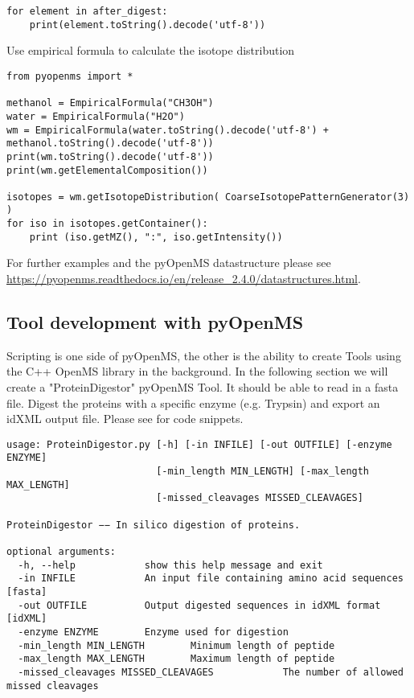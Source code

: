 {\begin{code}
\begin{verbatim}
for element in after_digest:
    print(element.toString().decode('utf-8'))
\end{verbatim}
\end{code}

\noindent Use empirical formula to calculate the isotope distribution 
\begin{code}
\begin{verbatim}
from pyopenms import *

methanol = EmpiricalFormula("CH3OH")
water = EmpiricalFormula("H2O")
wm = EmpiricalFormula(water.toString().decode('utf-8') + methanol.toString().decode('utf-8'))
print(wm.toString().decode('utf-8'))
print(wm.getElementalComposition())

isotopes = wm.getIsotopeDistribution( CoarseIsotopePatternGenerator(3) )
for iso in isotopes.getContainer():
    print (iso.getMZ(), ":", iso.getIntensity())
\end{verbatim}
\end{code}

\noindent For further examples and the pyOpenMS datastructure please see \url{https://pyopenms.readthedocs.io/en/release_2.4.0/datastructures.html}. 

\subsection{Tool development with pyOpenMS}
Scripting is one side of pyOpenMS, the other is the ability to create Tools using the C++ OpenMS library in the background.  In the following section we will create a "ProteinDigestor" pyOpenMS Tool. It should be able to read in a fasta file. Digest the proteins with a specific enzyme (e.g. Trypsin) and export an idXML output file. Please see   for code snippets.

\begin{code}
\begin{verbatim}
usage: ProteinDigestor.py [-h] [-in INFILE] [-out OUTFILE] [-enzyme ENZYME]
                          [-min_length MIN_LENGTH] [-max_length MAX_LENGTH]
                          [-missed_cleavages MISSED_CLEAVAGES]

ProteinDigestor −− In silico digestion of proteins.

optional arguments:
  -h, --help            show this help message and exit
  -in INFILE            An input file containing amino acid sequences [fasta]
  -out OUTFILE          Output digested sequences in idXML format [idXML]
  -enzyme ENZYME        Enzyme used for digestion
  -min_length MIN_LENGTH		Minimum length of peptide
  -max_length MAX_LENGTH		Maximum length of peptide
  -missed_cleavages MISSED_CLEAVAGES			The number of allowed missed cleavages
\end{verbatim}
\end{code}

}
